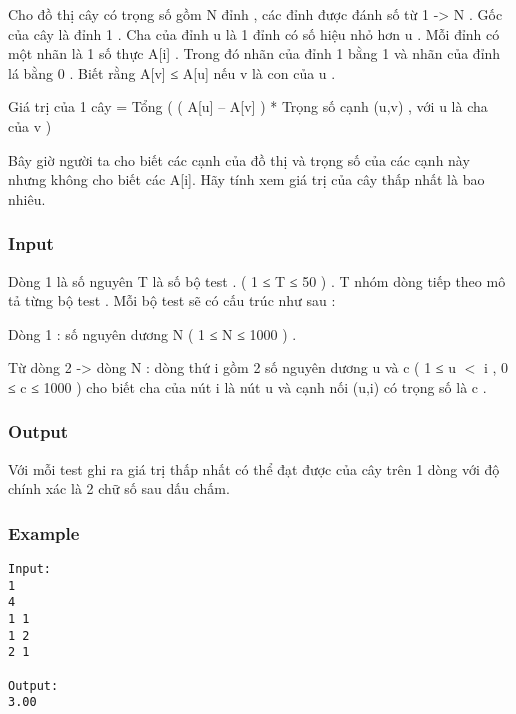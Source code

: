 



   Cho đồ thị cây có trọng số gồm N đỉnh , các đỉnh được đánh số từ 1 -> N . Gốc của cây là đỉnh 1 . Cha của đỉnh u là 1 đỉnh có số hiệu nhỏ hơn u . Mỗi đỉnh có một nhãn là 1 số thực A[i] . Trong đó nhãn của đỉnh 1 bằng 1 và nhãn của đỉnh lá bằng 0 . Biết rằng A[v] ≤ A[u] nếu v là con của u .   


   Giá trị của 1 cây = Tổng (  ( A[u] – A[v] ) * Trọng số cạnh (u,v)  , với u là cha của v )   


   Bây giờ người ta cho biết các cạnh của đồ thị và trọng số của các cạnh này nhưng không cho biết các A[i]. Hãy tính xem giá trị của cây thấp nhất là bao nhiêu.  

\subsubsection{   Input  }

   Dòng 1 là số nguyên T là số bộ test . (  1 ≤ T ≤ 50 ) . T nhóm dòng tiếp theo mô tả từng bộ test . Mỗi bộ test sẽ có cấu trúc như sau :   


   Dòng 1 : số nguyên dương N ( 1 ≤ N ≤ 1000 ) .   


   Từ dòng 2 -> dòng N : dòng thứ i gồm 2 số nguyên dương u và c ( 1 ≤ u $<$ i , 0 ≤ c ≤ 1000 ) cho biết cha của nút i là nút u và cạnh nối (u,i) có trọng số là c .  

\subsubsection{   Output  }

   Với mỗi test ghi ra giá trị thấp nhất có thể đạt được của cây trên 1 dòng với độ chính xác là 2 chữ số sau dấu chấm.  

\subsubsection{   Example  }
\begin{verbatim}
Input:
1
4
1 1
1 2
2 1

Output:
3.00
\end{verbatim}
